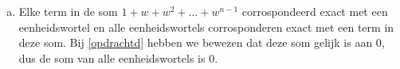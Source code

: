 \documentclass[12pt, a4paper]{article}
\begin{document}
\begin{enumerate}[(a).]
    \begin{proof}
        $ $\newline
        Neem $S = 1 + w + w^2 + \dots + w^{n - 1}$. \newline
        Dan $S \cdot w = w + w^2 + \dots + w^n = S - 1 + w^n$. \newline
        Dan kunnen we schrijven $S\cdot w - S = -1 + w^n$. \newline
        Omdat $w^n = {(e^{\frac{2\pi i}{n}})}^n = e^{2\pi i} = 1$, $-1 + w^n = 0$. \newline
        Dus $s(w - 1) = 0$ geeft $S = 1 + w + w^2 + \dots + w^{n - 1} = 0$.
    \end{proof}

    \item 
    Elke term in de som $1 + w + w^2 + \dots + w^{n - 1}$ corrospondeerd exact met een eenheidswortel en alle eenheidswortels corrosponderen exact met een term in deze som. Bij \ref{opdrachtd} \!hebben we bewezen dat deze som gelijk is aan 0, dus de som van alle eenheidswortels is 0.
\end{enumerate}
\end{document}
